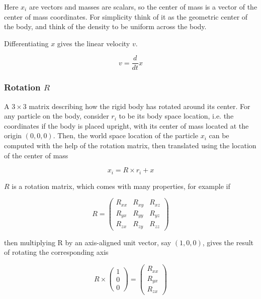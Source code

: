 \documentclass[12pt,a4paper,twoside,openright]{report}
\begin{document}
Here $x_i$ are vectors and masses are scalars, so the center of mass is a vector of the center of mass coordinates. For simplicity think of it as the geometric center of the body, and think of the density to be uniform across the body.

Differentiating $x$ gives the linear velocity $v$.

\begin{equation}
v = \frac{d}{dt}x
\end{equation}

\subsubsection{Rotation $R$} 

A $3\times 3$ matrix describing how the rigid body has rotated around its center. For any particle on the body, consider $r_i$ to be its body space location, i.e. the coordinates if the body is placed upright, with its center of mass located at the origin $(0, 0, 0)$. Then, the world space location of the particle $x_i$ can be computed with the help of the rotation matrix, then translated using the location of the center of mass

\begin{equation}
x_i = R\times r_i + x\label{eq:1}
\end{equation}

$R$ is a rotation matrix, which comes with many properties, for example if

\begin{equation}
    R = \begin{pmatrix}
        R_{xx} & R_{xy} & R_{xz} \\
        R_{yx} & R_{yy} & R_{yz} \\
        R_{zx} & R_{zy} & R_{zz}
    \end{pmatrix}
\end{equation}

then multiplying R by an axis-aligned unit vector, say $(1, 0, 0)$, gives the result of rotating the corresponding axis

\begin{equation}
R \times\begin{pmatrix}
    1 \\
    0 \\
    0
    \end{pmatrix}
    =
    \begin{pmatrix}
    R_{xx} \\
    R_{yx} \\
    R_{zx}
    \end{pmatrix}
\end{equation}
\end{document}
